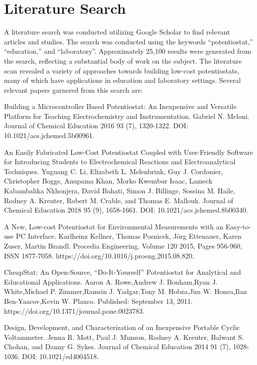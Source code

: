 \documentclass{article}
\begin{document}
\newpage 
\section*{\textcolor{mycolor}{Literature Search}}
A literature search was conducted utilizing Google Scholar to find relevant articles and studies. The search was conducted using the keywords ``potentiostat,'' ``education,'' and ``laboratory''. Approximately 25,100 results were generated from the search, reflecting a substantial body of work on the subject. The literature scan revealed a variety of approaches towards building low-cost potentiostats, many of which have applications in education and laboratory settings. Several relevant papers garnered from this search are: 


Building a Microcontroller Based Potentiostat: An Inexpensive and Versatile Platform for Teaching Electrochemistry and Instrumentation.
Gabriel N. Meloni.
Journal of Chemical Education 2016 93 (7), 1320-1322.
DOI: 10.1021/acs.jchemed.5b00961.

An Easily Fabricated Low-Cost Potentiostat Coupled with User-Friendly Software for Introducing Students to Electrochemical Reactions and Electroanalytical Techniques.
Yuguang C. Li, Elizabeth L. Melenbrink, Guy J. Cordonier, Christopher Boggs, Anupama Khan, Morko Kwembur Isaac, Lameck Kabambalika Nkhonjera, David Bahati, Simon J. Billinge, Sossina M. Haile, Rodney A. Kreuter, Robert M. Crable, and Thomas E. Mallouk.
Journal of Chemical Education 2018 95 (9), 1658-1661.
DOI: 10.1021/acs.jchemed.8b00340.

A New, Low-cost Potentiostat for Environmental Measurements with an Easy-to-use PC Interface.
Karlheinz Kellner, Thomas Posnicek, Jörg Ettenauer, Karen Zuser, Martin Brandl.
Procedia Engineering.
Volume 120
2015,
Pages 956-960,
ISSN 1877-7058.
https://doi.org/10.1016/j.proeng.2015.08.820.

CheapStat: An Open-Source, “Do-It-Yourself” Potentiostat for Analytical and Educational Applications.
Aaron A. Rowe,Andrew J. Bonham,Ryan J. White,Michael P. Zimmer,Ramsin J. Yadgar,Tony M. Hobza,Jim W. Honea,Ilan Ben-Yaacov,Kevin W. Plaxco.
Published: September 13, 2011.
https://doi.org/10.1371/journal.pone.0023783.

Design, Development, and Characterization of an Inexpensive Portable Cyclic Voltammeter.
Jenna R. Mott, Paul J. Munson, Rodney A. Kreuter, Balwant S. Chohan, and Danny G. Sykes.
Journal of Chemical Education 2014 91 (7), 1028-1036.
DOI: 10.1021/ed4004518.
\end{document}
